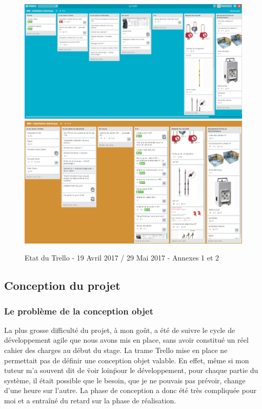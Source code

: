 \documentclass[a4paper]{article}
\begin{document}
     \begin{figure}[H]
        \centering
        \includegraphics[scale=0.15]{img/trello1}
        \includegraphics[scale=0.15]{img/trello2}
        \caption{Etat du Trello - 19 Avril 2017 / 29 Mai 2017 - Annexes 1 et 2}
     \end{figure} 

    \subsection{Conception du projet}

    \subsubsection{Le problème de la conception objet}

    La plus grosse difficulté du projet, à mon goût, a été de suivre le cycle de développement agile que nous avons mis en place, sans avoir constitué un réel cahier des charges au début du stage. La trame Trello mise en place ne permettait pas de définir une conception objet valable. En effet, même si mon tuteur m'a souvent dit de \"voir loin\" pour le développement, pour chaque partie du système, il était possible que le besoin, que je ne pouvais pas prévoir, change d'une heure sur l'autre. La phase de conception a donc été très compliquée pour moi et a entraîné du retard sur la phase de réalisation. \\
    
\end{document}

